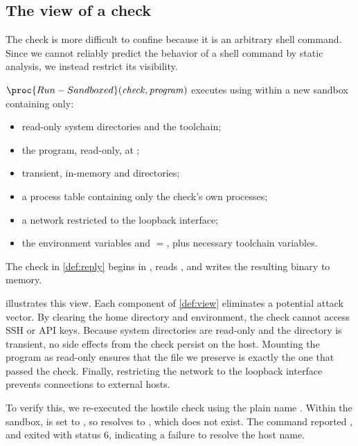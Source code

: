 \documentclass[10pt,twocolumn,a4paper]{article}
\begin{document}
\subsection{The view of a check}

The check is more difficult to confine because it is an arbitrary shell command. Since we cannot reliably predict the behavior of a shell command by static analysis, we instead restrict its visibility.

\begin{definition}\label{def:view}
$\proc{Run-Sandboxed}(\var{check}, \var{program})$ executes  using  within a new sandbox containing only:
\begin{itemize}[nosep,leftmargin=*]
  \item read-only system directories and the toolchain;
  \item the program, read-only, at ;
  \item transient, in-memory  and  directories;
  \item a process table containing only the check's own processes;
  \item a network restricted to the loopback interface;
  \item the environment variables  and ${}={}$, plus necessary toolchain variables.
\end{itemize}
\example The check in \cref{def:reply} begins in , reads , and writes the resulting binary to memory.
\end{definition}



 illustrates this view. Each component of \cref{def:view} eliminates a potential attack vector. By clearing the home directory and environment, the check cannot access SSH or API keys. Because system directories are read-only and the  directory is transient, no side effects from the check persist on the host. Mounting the program as read-only ensures that the file we preserve is exactly the one that passed the check. Finally, restricting the network to the loopback interface prevents connections to external hosts.

To verify this, we re-executed the hostile check using the plain name . Within the sandbox,  is set to , so  resolves to , which does not exist. The  command reported , and  exited with status 6, indicating a failure to resolve the host name.
\end{document}
